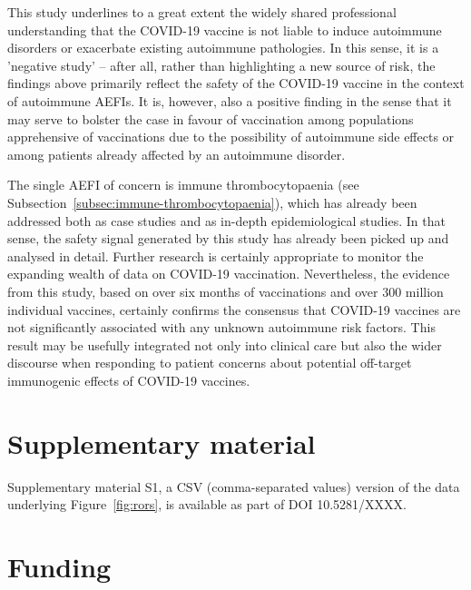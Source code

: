 \documentclass{article}
\begin{document}
This study underlines to a great extent the widely shared professional understanding that the COVID-19 vaccine is not liable to induce autoimmune disorders or exacerbate existing autoimmune pathologies.\cite{soy2021practical,ali2021covid,furer2021point}
In this sense, it is a 'negative study'\cite{doi:10.1056/NEJM200102013440509} -- after all, rather than highlighting a new source of risk, the findings above primarily reflect the safety of the COVID-19 vaccine in the context of autoimmune AEFIs.
It is, however, also a positive finding in the sense that it may serve to bolster the case in favour of vaccination among populations apprehensive of vaccinations due to the possibility of autoimmune side effects or among patients already affected by an autoimmune disorder.

The single AEFI of concern is immune thrombocytopaenia (see Subsection~\ref{subsec:immune-thrombocytopaenia}), which has already been addressed both as case studies\cite{xie2021covid,tarawneh2021immune,tiede2021prothrombotic,pai2021vaccine} and as in-depth epidemiological studies.\cite{WELSH20213329}
In that sense, the safety signal generated by this study has already been picked up and analysed in detail.
Further research is certainly appropriate to monitor the expanding wealth of data on COVID-19 vaccination.
Nevertheless, the evidence from this study, based on over six months of vaccinations and over 300 million individual vaccines, certainly confirms the consensus that COVID-19 vaccines are not significantly associated with any unknown autoimmune risk factors.
This result may be usefully integrated not only into clinical care but also the wider discourse when responding to patient concerns about potential off-target immunogenic effects of COVID-19 vaccines.

\vspace{6pt}

\section*{Supplementary material}

Supplementary material S1, a CSV (comma-separated values) version of the data underlying Figure~\ref{fig:rors}, is available as part of DOI 10.5281/XXXX.

\section*{Funding}
\end{document}
